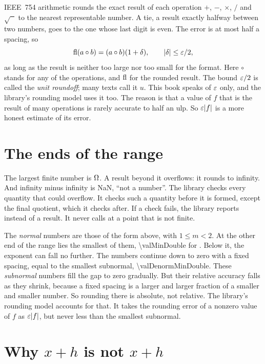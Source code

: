 IEEE~754 arithmetic rounds the exact result of each operation $+$, $-$, $\times$, $/$ and $\sqrt{\phantom{x}}$ to the
nearest representable number. A tie, a result exactly halfway between two numbers, goes to the one whose last digit
is even. The error is at most half a spacing, so
\begin{equation*}
  \operatorname{fl}(a \circ b) = (a \circ b)(1 + \delta), \qquad \lvert \delta \rvert \le \varepsilon / 2,
\end{equation*}
as long as the result is neither too large nor too small for the format. Here $\circ$ stands for any of the
operations, and $\operatorname{fl}$ for the rounded result. The bound $\varepsilon / 2$ is called the \emph{unit roundoff}; many texts
call it $u$. This book speaks of $\varepsilon$ only, and the library's rounding model uses it too. The reason is that a
value of $f$ that is the result of many operations is rarely accurate to half an ulp. So $\varepsilon \lvert f \rvert$ is a more
honest estimate of its error.

\section{The ends of the range}\label{sec:fp-range}

The largest finite number is $\Omega$. A result beyond it overflows: it rounds to infinity. And infinity minus
infinity is NaN, ``not a number''. The library checks every quantity that could overflow. It checks such a quantity
before it is formed, except the final quotient, which it checks after. If a check fails, the library reports
 instead of a result. It never calls  at a point that is not finite.

The \emph{normal} numbers are those of the form above, with $1 \le m < 2$. At the other end of the range lies the
smallest of them, \num{\valMinDouble} for . Below it, the exponent can fall no further. The numbers continue down to zero with a fixed spacing,
equal to the smallest subnormal, \num{\valDenormMinDouble}. These \emph{subnormal} numbers fill the gap to zero
gradually. But their relative accuracy falls as they shrink, because a fixed spacing is a larger and larger fraction
of a smaller and smaller number. So rounding there is absolute, not relative. The library's rounding model accounts
for that. It takes the rounding error of a nonzero value of $f$ as $\varepsilon \lvert f \rvert$, but never less than the
smallest subnormal.

\section{Why $x + h$ is not $x + h$}\label{sec:fp-step}

